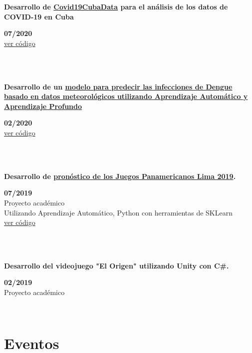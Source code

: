 \documentclass{article}
\begin{document}
    \begin{minipage}{0.8\textwidth}
    \parbox{0.8\linewidth}{\textbf{Desarrollo de \hyperref[sec:covid]{Covid19CubaData} para el análisis de los datos de COVID-19 en Cuba}} \hfill \textbf{07/2020}\\
    \href{https://github.com/covid19cuba/covid19cuba-action}{ver código}\
    \end{minipage} \hfill {}\\\\
    \begin{minipage}{0.8\textwidth}
    \parbox{0.8\linewidth}{\textbf{Desarrollo de un \hyperref[sec:dengue]{modelo para predecir las infecciones de Dengue basado en datos meteorológicos utilizando Aprendizaje Automático y Aprendizaje Profundo}}} \hfill \textbf{02/2020}\\
    \href{https://github.com/JavierOramas/DengAI}{ver código}\\
    \end{minipage} \hfill {}\\\\
    \begin{minipage}{0.8\textwidth}
    \parbox{0.8\linewidth}{\textbf{Desarrollo de \hyperref[sec:panamerican]{pronóstico de los Juegos Panamericanos Lima 2019}.}} \hfill \textbf{07/2019}\\
    Proyecto académico\\
    Utilizando Aprendizaje Automático, Python con herramientas de SKLearn\\
    \href{https://github.com/JavierOramas/PanamericanPredictor}{ver código}\\
    \end{minipage} \hfill {}\\\\
    \begin{minipage}{0.8\textwidth}
    \parbox{0.8\linewidth}{\textbf{Desarrollo del videojuego "El Origen" utilizando Unity con C\#.}} \hfill \textbf{02/2019}\\
    Proyecto académico\\
    \end{minipage} \\

\section*{Eventos}
\end{document}
